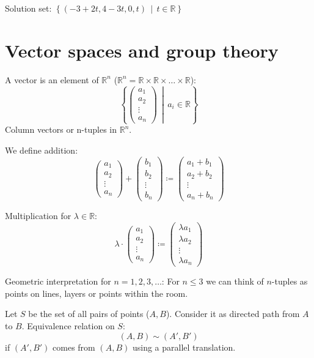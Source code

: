 \documentclass[a4paper,landscape,twocolumn]{article}
\newcommand\setdef[2]{\left\{#1\,\middle|\,#2\right\}}
\begin{document}
Solution set: $\setdef{(-3 + 2t, 4 - 3t, 0, t)}{t \in \mathbb{R}}$

\section{Vector spaces and group theory}

A vector is an element of $\mathbb{R}^n$ ($\mathbb{R}^n = \mathbb{R} \times \mathbb{R} \times \ldots \times \mathbb{R}$):
\[ \setdef{\begin{pmatrix} a_1 \\ a_2 \\ \vdots \\ a_n\end{pmatrix}}{a_i \in \mathbb{R}} \]
Column vectors or n-tuples in $\mathbb{R}^n$.

We define addition:
\[
  \begin{pmatrix} a_1 \\ a_2 \\ \vdots \\ a_n \end{pmatrix} +
  \begin{pmatrix} b_1 \\ b_2 \\ \vdots \\ b_n \end{pmatrix} \coloneqq
  \begin{pmatrix} a_1 + b_1 \\ a_2 + b_2 \\ \vdots \\ a_n + b_n \end{pmatrix}
\]

Multiplication for $\lambda \in \mathbb{R}$:
\[
  \lambda \cdot \begin{pmatrix} a_1 \\ a_2 \\ \vdots \\ a_n \end{pmatrix} \coloneqq
  \begin{pmatrix} \lambda a_1 \\ \lambda a_2 \\ \vdots \\ \lambda a_n \end{pmatrix}
\]

Geometric interpretation for $n=1,2,3,\ldots$:
  For $n \leq 3$ we can think of $n$-tuples as points on lines, layers or points within the room.

Let $S$ be the set of all pairs of points ($A, B$). Consider it as directed path from $A$ to $B$.
Equivalence relation on $S$:
\[ (A, B) \sim (A', B') \]
if $(A', B')$ comes from $(A, B)$ using a parallel translation.
\end{document}
